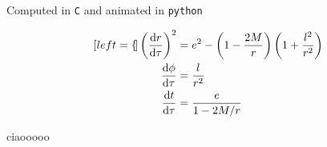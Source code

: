 Computed in \texttt{C} and animated in \texttt{python}

\begin{subequations}
\label{cap2:eq:orbits}
    \begin{align}[left = {\empheqlbrace}]
        \left(\dv{r}{\tau}\right)^2 &= e^2 - \left(1 - \frac{2M}{r}\right)
        \left(1 + \frac{l^2}{r^2}\right) \label{cap2:eq:r_of_tau} \\
        \dv{\phi}{\tau} &= \frac{l}{r^2} \label{cap2:eq:phi_of_tau}\\
        \dv{t}{\tau} &= \frac{e}{1 - 2 M / r} \label{cap2:eq:t_of_tau}
    \end{align}
\end{subequations}


ciaooooo \cite{eco2017come}

